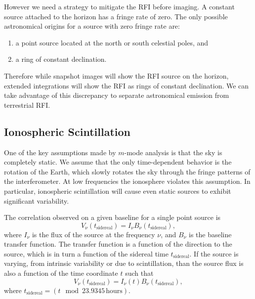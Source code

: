 \documentclass[twocolumn]{aastex6}
\begin{document}
However we need a strategy to mitigate the RFI before imaging. A constant source attached to the
horizon has a fringe rate of zero. The only possible astronomical origins for a source with zero
fringe rate are:

\begin{enumerate}
    \item a point source located at the north or south celestial poles, and
    \item a ring of constant declination.
\end{enumerate}

Therefore while snapshot images will show the RFI source on the horizon, extended integrations will
show the RFI as rings of constant declination. We can take advantage of this discrepancy to separate
astronomical emission from terrestrial RFI.




\subsection{Ionospheric Scintillation}

One of the key assumptions made by $m$-mode analysis is that the sky is completely static.  We
assume that the only time-dependent behavior is the rotation of the Earth, which slowly rotates the
sky through the fringe patterns of the interferometer. At low frequencies the ionosphere violates
this assumption. In particular, ionospheric scintillation will cause even static sources to exhibit
significant variability.

The correlation observed on a given baseline for a single point source is
\begin{equation}
    V_\nu(t_{\textrm{sidereal}}) = I_\nu B_\nu(t_{\textrm{sidereal}}),
\end{equation}
where $I_\nu$ is the flux of the source at the frequency $\nu$, and $B_\nu$
is the baseline transfer function. The transfer function is a function of
the direction to the source, which is in turn a function of the sidereal
time $t_{\textrm{sidereal}}$. If the source is varying, from intrinsic
variability or due to scintillation, than the source flux is also a function
of the time coordinate $t$ such that
\begin{equation}
    V_\nu(t_{\textrm{sidereal}}) = I_\nu(t) B_\nu(t_{\textrm{sidereal}}),
\end{equation}
where $t_{\textrm{sidereal}} = (t \mod 23.9345\,\textrm{hours})$.
\end{document}
